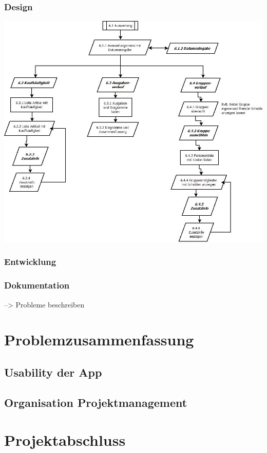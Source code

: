 \documentclass[12pt,a4paper]{article}
\begin{document}
\subsubsection*{Design}
\includegraphics[scale=0.6, origin=l]{060 Auswertungen.jpeg}
\subsubsection*{Entwicklung}

\subsubsection*{Dokumentation} --> Probleme beschreiben
\newpage

\section{Problemzusammenfassung}
\subsection{Usability der App}
\newpage
\subsection{Organisation Projektmanagement}
\newpage
\section{Projektabschluss}
\end{document}
